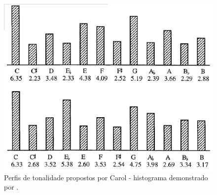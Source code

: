 \documentclass[
	12pt,				%
	openright,			%
	twoside,			%
	a4paper,			%
	english,			%
	french,				%
	spanish,			%
	brazil				%
	]{abntex2}
\begin{document}
\begin{figure}[!h]
	\caption{\label{fig_grafico}Perfis de tonalidade propostos por Carol  - histograma demonstrado por . }
	\begin{center}
	    \includegraphics[scale=0.4]{CBMS/krumhansl_temperley_p174.png}
	\end{center}
\end{figure}
\end{document}
